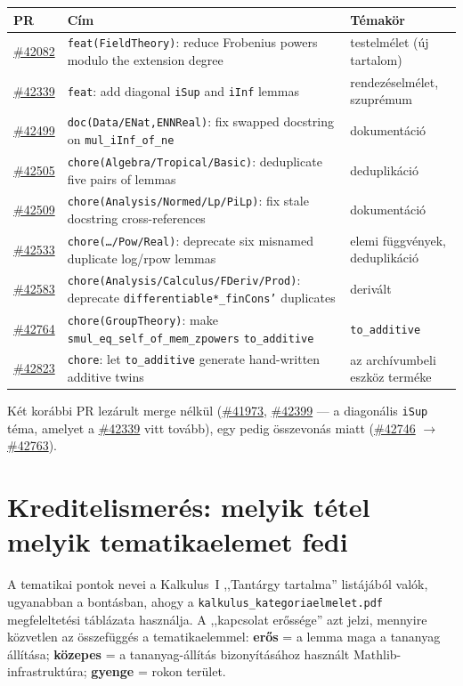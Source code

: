 \documentclass[11pt,a4paper]{article}
\newcommand{\lean}[1]{\texttt{\small #1}}
\newcommand{\bk}{\allowbreak}
\newcommand{\pr}[1]{\href{https://github.com/leanprover-community/mathlib4/pull/#1}{\##1}}
\begin{document}
\begingroup
\small
\begin{longtable}{@{}>{\raggedright\arraybackslash}p{1.3cm}>{\raggedright\arraybackslash}p{8.9cm}>{\raggedright\arraybackslash}p{4.2cm}@{}}
\toprule
\textbf{PR} & \textbf{Cím} & \textbf{Témakör}\\
\midrule
\endfirsthead
\bottomrule
\endfoot
\pr{42082} & \lean{feat(FieldTheory)}: reduce Frobenius powers modulo the extension degree & testelmélet (új tartalom)\\
\pr{42339} & \lean{feat}: add diagonal \lean{iSup} and \lean{iInf} lemmas & rendezéselmélet, szuprémum\\
\pr{42499} & \lean{doc(Data/\bk ENat,ENNReal)}: fix swapped docstring on \lean{mul\_\bk iInf\_\bk of\_\bk ne} & dokumentáció\\
\pr{42505} & \lean{chore(Algebra/\bk Tropical/\bk Basic)}: deduplicate five pairs of lemmas & deduplikáció\\
\pr{42509} & \lean{chore(Analysis/\bk Normed/\bk Lp/\bk PiLp)}: fix stale docstring cross-references & dokumentáció\\
\pr{42533} & \lean{chore(\dots/\bk Pow/\bk Real)}: deprecate six misnamed duplicate log/rpow lemmas & elemi függvények, deduplikáció\\
\pr{42583} & \lean{chore(Analysis/\bk Calculus/\bk FDeriv/\bk Prod)}: deprecate \lean{differentiable*\_\bk finCons'} duplicates & derivált\\
\pr{42764} & \lean{chore(GroupTheory)}: make \lean{smul\_\bk eq\_\bk self\_\bk of\_\bk mem\_\bk zpowers} \lean{to\_\bk additive} & \lean{to\_\bk additive}\\
\pr{42823} & \lean{chore}: let \lean{to\_\bk additive} generate hand-written additive twins & az archívumbeli eszköz terméke\\
\end{longtable}
\endgroup

\noindent
Két korábbi PR lezárult merge nélkül (\pr{41973}, \pr{42399} --- a diagonális
\lean{iSup} téma, amelyet a \pr{42339} vitt tovább), egy pedig
összevonás miatt (\pr{42746} $\to$ \pr{42763}).

\section{Kreditelismerés: melyik tétel melyik tematikaelemet fedi}

A tematikai pontok nevei a Kalkulus~I ,,Tantárgy tartalma'' listájából valók,
ugyanabban a bontásban, ahogy a \lean{kalkulus\_\bk kategoriaelmelet.\bk pdf}
megfeleltetési táblázata használja. A ,,kapcsolat erőssége'' azt jelzi,
mennyire közvetlen az összefüggés a tematikaelemmel: \textbf{erős} = a lemma
maga a tananyag állítása; \textbf{közepes} = a tananyag-állítás bizonyításához
használt Mathlib-infrastruktúra; \textbf{gyenge} = rokon terület.
\end{document}
